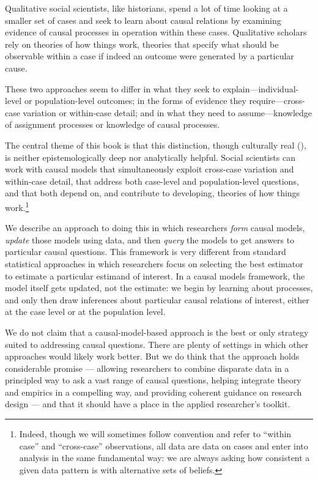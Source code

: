 \documentclass[
  12pt,
]{book}
\begin{document}
Qualitative social scientists, like historians, spend a lot of time looking at a smaller set of cases and seek to learn about causal relations by examining evidence of causal processes in operation within these cases. Qualitative scholars rely on theories of how things work, theories that specify what should be observable within a case if indeed an outcome were generated by a particular cause.

These two approaches seem to differ in what they seek to explain---individual-level or population-level outcomes; in the forms of evidence they require---cross-case variation or within-case detail; and in what they need to assume---knowledge of assignment processes or knowledge of causal processes.

The central theme of this book is that this distinction, though culturally real (\citet{goertz2012tale}), is neither epistemologically deep nor analytically helpful. Social scientists can work with causal models that simultaneously exploit cross-case variation and within-case detail, that address both case-level and population-level questions, and that both depend on, and contribute to developing, theories of how things work.\footnote{Indeed, though we will sometimes follow convention and refer to ``within case'' and ``cross-case'' observations, all data are data on cases and enter into analysis in the same fundamental way: we are always asking how consistent a given data pattern is with alternative sets of beliefs.}

We describe an approach to doing this in which researchers \emph{form} causal models, \emph{update} those models using data, and then \emph{query} the models to get answers to particular causal questions. This framework is very different from standard statistical approaches in which researchers focus on selecting the best estimator to estimate a particular estimand of interest. In a causal models framework, the model itself gets updated, not the estimate: we begin by learning about processes, and only then draw inferences about particular causal relations of interest, either at the case level or at the population level.

We do not claim that a causal-model-based approach is the best or only strategy suited to addressing causal questions. There are plenty of settings in which other approaches would likely work better. But we do think that the approach holds considerable promise --- allowing researchers to combine disparate data in a principled way to ask a vast range of causal questions, helping integrate theory and empirics in a compelling way, and providing coherent guidance on research design --- and that it should have a place in the applied researcher's toolkit.
\end{document}

